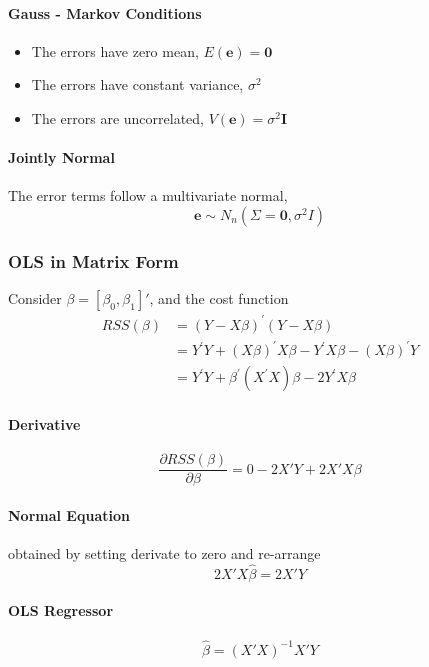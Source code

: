 \documentclass[11pt]{article}
\newcommand{\be}{\mathbf{e}}
\newcommand{\bzero}{\mathbf{0}}
\begin{document}
\paragraph{Gauss - Markov Conditions}
\begin{itemize}
    \item The errors have zero mean, $E(\be) = \bzero$
    \item The errors have constant variance, $\sigma^2$
    \item The errors are uncorrelated, $V(\be) = \sigma^2 \mathbf{I}$
\end{itemize}
\paragraph{Jointly Normal} The error terms follow a multivariate normal, 
\begin{equation*}
    \be \sim N_n (\Sigma = \bzero, \sigma^2 I)
\end{equation*}

\subsubsection{OLS in Matrix Form}
Consider $\beta = [\beta_0, \beta_1]'$, and the cost function
\begin{align*} 
    RSS(\beta) 
    &= ({Y}-{X} \beta)^{\prime}({Y}-{X} \beta) \\
    &={Y}^{\prime} {Y}+({X} \beta)^{\prime} {X} {\beta}-{Y}^{\prime} {X} {\beta}-({X} {\beta})^{\prime} {Y} \\ 
    &={Y}^{\prime} {Y}+\beta^{\prime}\left({X}^{\prime} {X}\right) \beta-2 {Y}^{\prime} {X} {\beta} 
\end{align*}
\paragraph{Derivative}
\begin{equation*}
    \frac{\partial RSS(\beta)}{\partial \beta} = 0 - 2X'Y + 2X'X\beta
\end{equation*}
\paragraph{Normal Equation} obtained by setting derivate to zero and re-arrange
\begin{equation*}
    2X'X\hat{\beta} = 2X'Y
\end{equation*}
\paragraph{OLS Regressor}
\begin{equation*}
    \hat{\beta} = (X'X)^{-1}X'Y
\end{equation*}
\end{document}
